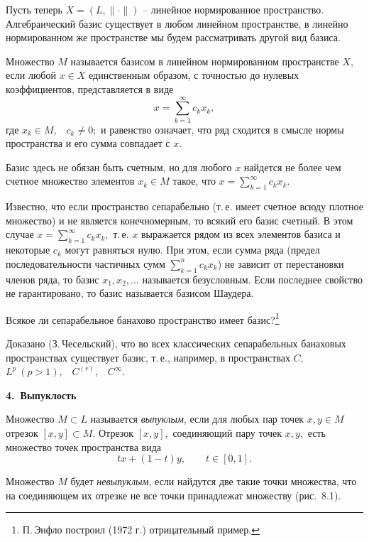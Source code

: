 Пусть теперь
$X=(L,\|\cdot\|)$ -- линейное нормированное пространство.
Алгебраический базис существует в любом линейном
пространстве, в линейно нормированном же пространстве мы
будем рассматривать другой вид базиса.

 Множество $M$ называется базисом в линейном нормированном
 пространстве $X,$ если любой $x\in X$ единственным образом,
 с точностью до нулевых коэффициентов, представляется в виде
 $$
 x=\sum\limits_{k=1}^{\infty} c_kx_k,
 $$
 где $x_k\in M,$~ $c_k\ne 0;$ {и равенство означает, что} ряд сходится в
 смысле нормы пространства {и его сумма совпадает с $x$.}

 Базис здесь не обязан быть счетным, но для любого $x$
 найдется не более чем счетное множество элементов $x_k\in M$
 такое, что $x=\sum\limits_{k=1}^{\infty}c_kx_k.$

 Известно, что если пространство сепарабельно
 (т.\,е. имеет счетное всюду плотное множество) и не является конечномерным,
 то всякий его базис счетный. В этом случае $x=\sum\limits_{k=1}^{\infty} c_kx_k,$
 т.\,е. $x$ выражается рядом из всех элементов базиса и некоторые $c_k$
 могут равняться нулю. При этом, если сумма ряда (предел последовательности частичных сумм
 $\sum\limits_{k=1}^{n} c_kx_k$) не зависит от перестановки членов
 ряда, то базис $x_1,x_2,\ldots$ называется безусловным.
 Если последнее свойство не гарантировано, то базис
 называется базисом Шаудера.

 \task %
 Всякое ли сепарабельное банахово пространство имеет
 базис?\footnote{П.\,Энфло построил (1972 г.) отрицательный пример.}

 Доказано (З.\,Чесельский), что во всех классических
 сепарабельных банаховых пространствах существует базис,
 т.\,е., например, в пространствах $C,$~ $L^p\ (p>1),$~ $C^{(r)},$~ $C^{\infty}.$

 \vspace{5mm}
 {\bf 4.~Выпуклость}
 \vspace{5mm}

   Множество $M\subset L$ называется {\it выпуклым},
 если для любых пар точек $x,y\in M$ отрезок $[x,y]\subset M.$
 Отрезок $[x,y],$ соединяющий пару точек $x,y,$ есть множество
 точек пространства вида
 $$
 tx+(1-t)y,\qquad t\in [0,1].
 $$

 Множество $M$ будет {\it невыпуклым}, если найдутся две такие точки
 множества, что на соединяющем их отрезке не все точки принадлежат
 множеству (рис.~8.1).
 \vspace{7mm}

